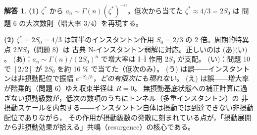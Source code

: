 \documentclass[dvipdfmx, uplatex]{jsarticle}
\newcommand{\hb}{\hbar}
\theoremstyle{definition}
\newtheorem*{sol}{解答}
\begin{document}
\begin{sol}
\textbf{(1)} $\zeta^\ast$ から $a_n\sim\Gamma(n)(\zeta^\ast)^{-n}$。低次から当てた $\zeta^\ast\approx4/3=2S_0$ は
問題 6 の大次数則（増大率 $3/4$）を再現する。

\textbf{(2)} $\zeta^\ast=2S_0=4/3$ は前半のインスタントン作用 $S_0=2/3$ の 2 倍。周期的特異点 $2NS_0$（問題 8）は
古典 N-インスタントン弱解に対応。正しいのは $\boxed{\text{(あ)(い)}}$。
(あ)：$a_n\sim\Gamma(n)/(2S_0)^n$ で増大率は I--$\bar{\mathrm I}$ 作用 $2S_0$ が支配。
(い)：問題 10 で $[2/2]$ が $2S_0$ を約 16 \% で当てた（低次のみ）。
(う) は誤――インスタントンは非摂動配位で振幅 $e^{-S_0/\hb}$，\emph{どの有限次にも現れない}。
(え) は誤――増大率が階乗的（問題 6）ゆえ収束半径は $R=0$。
無摂動基底状態への補正計算に過ぎない摂動級数が，低次の数項のうちにトンネル（多重インスタントン）の
非摂動スケールを内包する――インスタントン自体は摂動では到達できない非摂動配位でありながら，
その作用が摂動級数の発散に刻まれている点が，「摂動展開から非摂動効果が拾える」共鳴（resurgence）の核心である。
\end{sol}
\end{document}
